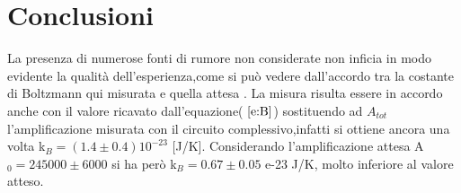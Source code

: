 \section{Conclusioni}
La presenza di numerose fonti di rumore non considerate non inficia in modo evidente la qualità dell'esperienza,come si può vedere dall'accordo tra la costante di Boltzmann qui misurata e quella attesa . La misura risulta essere in accordo anche con il valore ricavato dall'equazione( $\ref{e:B}$) sostituendo ad $A_{tot}$ l'amplificazione misurata con il circuito complessivo,infatti si ottiene ancora una volta k$_B = (1.4 \pm 0.4)10^{-23}$ [J/K]. Considerando l'amplificazione attesa A$_0 = 245000 \pm 6000$ si ha però k$_B = 0.67 \pm 0.05$ e-23 J/K, molto inferiore al valore atteso.\\